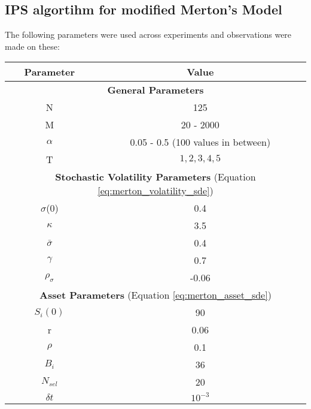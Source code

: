 \subsection{IPS algortihm for modified Merton's Model}
The following parameters were used across experiments and observations were made
on these:
\begin{center}
	\begin{tabular}{|c|c|}
		\hline
		Parameter       & Value                              \\
		\hline
		\multicolumn{2}{|c|}{\textbf{General Parameters}}\\
		\hline
		N               & 125                                \\
		\hline
		M               & 20 - 2000                          \\
		\hline
		$\alpha $       & 0.05 - 0.5 (100 values in between) \\
		\hline
		T               & $1, 2, 3, 4, 5$                    \\
		\hline
		\multicolumn{2}{|c|}{\textbf{Stochastic Volatility Parameters} (Equation
		\ref{eq:merton_volatility_sde})}\\
		\hline
		$\sigma$(0)     & 0.4                                \\
		\hline
		$\kappa $       & 3.5                                \\
		\hline
		$\bar{\sigma}$  & 0.4                                \\
		\hline
		$\gamma$        & 0.7                                \\
		\hline
		$\rho_{\sigma}$ & -0.06                              \\
		\hline
		\multicolumn{2}{|c|}{\textbf{Asset Parameters} (Equation \ref{eq:merton_asset_sde})}\\
		\hline
		$S_i(0)$        & 90                                 \\
		\hline
		r               & 0.06                               \\
		\hline
		$\rho$          & 0.1                                \\
		\hline
		$B_i$           & 36                                 \\
		\hline
		$N_{sel}$       & 20                                 \\
		\hline
		$\delta t$      & $10^{-3}$                          \\
		\hline
	\end{tabular}
\end{center}

